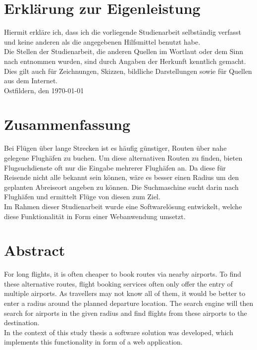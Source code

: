\documentclass[12pt,twoside,a4paper]{article}
\begin{document}
\section*{Erklärung zur Eigenleistung}
Hiermit erkläre ich, dass ich die vorliegende Studienarbeit selbständig verfasst und keine anderen als die angegebenen Hilfsmittel benutzt habe.\\
Die Stellen der Studienarbeit, die anderen Quellen im Wortlaut oder dem Sinn nach entnommen wurden, sind durch Angaben der Herkunft kenntlich gemacht. Dies gilt auch für Zeichnungen, Skizzen, bildliche Darstellungen sowie für Quellen aus dem Internet.
\vspace{1cm}\\Ostfildern, den \today \hspace{1cm} \hrulefill
\newpage
\begin{sloppypar}
\section*{Zusammenfassung}
Bei Flügen über lange Strecken ist es häufig günstiger, Routen über nahe gelegene Flughäfen zu buchen. Um diese alternativen Routen zu finden, bieten Flugsuchdienste oft nur die Eingabe mehrerer Flughäfen an. Da diese für Reisende nicht alle bekannt sein können, wäre es besser einen Radius um den geplanten Abreiseort angeben zu können. Die Suchmaschine sucht darin nach Flughäfen und ermittelt Flüge von diesen zum Ziel.\\
Im Rahmen dieser Studienarbeit wurde eine Softwarelösung entwickelt, welche diese Funktionalität in Form einer Webanwendung umsetzt.
\section*{Abstract}
For long flights, it is often cheaper to book routes via nearby airports. To find these alternative routes, flight booking services often only offer the entry of multiple airports. As travellers may not know all of them, it would be better to enter a radius around the planned departure location. The search engine will then search for airports in the given radius and find flights from these airports to the destination.\\
In the context of this study thesis a software solution was developed, which implements this functionality in form of a web application.
\newpage
\tableofcontents
\listoffigures
\printglossary[type=\acronymtype]
\printglossary
\newpage
{}
\setcounter{page}{1}

\end{sloppypar}
\end{document}
